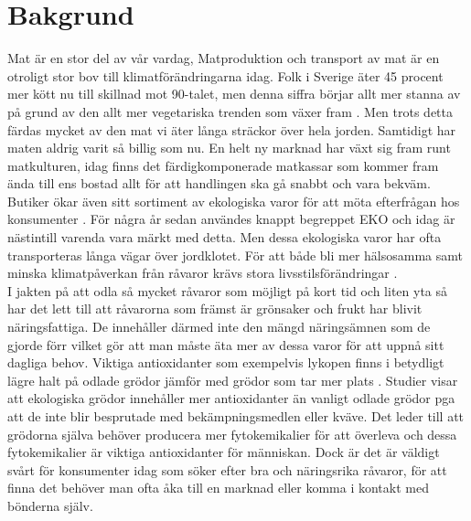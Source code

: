 \documentclass[10pt,a4paper,oneside]{article}
\begin{document}
\section{Bakgrund}
Mat är en stor del av vår vardag, Matproduktion och transport av mat är en otroligt stor bov till klimatförändringarna idag. Folk i Sverige äter 45 procent mer kött nu till skillnad mot 90-talet, men denna siffra börjar allt mer stanna av på grund av den allt mer vegetariska trenden som växer fram \cite{Naturskyddsföreningen1}. Men trots detta färdas mycket av den mat vi äter långa sträckor över hela jorden. Samtidigt har maten aldrig varit så billig som nu. En helt ny marknad har växt sig fram runt matkulturen, idag finns det färdigkomponerade matkassar som kommer fram ända till ens bostad allt för att handlingen ska gå snabbt och vara bekväm. Butiker ökar även sitt sortiment av ekologiska varor för att möta efterfrågan hos konsumenter \cite{ICA2}. För några år sedan användes knappt begreppet EKO och idag är nästintill varenda vara märkt med detta. Men dessa ekologiska varor har ofta transporteras långa vägar över jordklotet. För att både bli mer hälsosamma samt minska klimatpåverkan från råvaror krävs stora livsstilsförändringar \cite{Jordbruksverket}. \\
 
I jakten på att odla så mycket råvaror som möjligt på kort tid och liten yta så har det lett till att råvarorna som främst är grönsaker och frukt har blivit näringsfattiga. De innehåller därmed inte den mängd näringsämnen som de gjorde förr vilket gör att man måste äta mer av dessa varor för att uppnå sitt dagliga behov. Viktiga antioxidanter som exempelvis lykopen finns i betydligt lägre halt på odlade grödor jämför med grödor som tar mer plats \cite{SR}. Studier visar att ekologiska grödor innehåller mer antioxidanter än vanligt odlade grödor pga att de inte blir besprutade med bekämpningsmedlen eller kväve. Det leder till att grödorna själva behöver producera mer fytokemikalier för att överleva och dessa fytokemikalier är viktiga antioxidanter för människan. Dock är det är väldigt svårt för konsumenter idag som söker efter bra och näringsrika råvaror, för att finna det behöver man ofta åka till en marknad eller komma i kontakt med bönderna själv.\\
 
\end{document}
